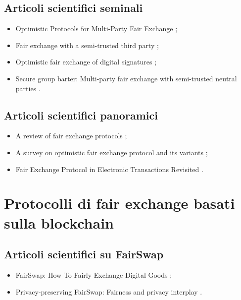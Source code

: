 \subsection*{Articoli scientifici seminali}
\begin{itemize}

\item Optimistic Protocols for Multi-Party Fair Exchange \cite{asokan1996fairexchange};

\item Fair exchange with a semi-trusted third party \cite{franklin1997fairexchange};

\item Optimistic fair exchange of digital signatures \cite{asokan1998fairexchange};

\item Secure group barter: Multi-party fair exchange with semi-trusted neutral parties \cite{franklin1998fairexchange}.

\end{itemize}

\subsection*{Articoli scientifici panoramici}
\begin{itemize}

\item A review of fair exchange protocols \cite{alotaibi2012fairreview};

\item A survey on optimistic fair exchange protocol and its variants \cite{loh2017fairreview};

\item Fair Exchange Protocol in Electronic Transactions Revisited \cite{duangphasuk2020fairreview}.

\end{itemize}

\section*{Protocolli di fair exchange basati sulla blockchain}

\subsection*{Articoli scientifici su FairSwap}
\begin{itemize}

\item FairSwap: How To Fairly Exchange Digital Goods \cite{dziembowski2018fairswap};

\item Privacy-preserving FairSwap: Fairness and privacy interplay \cite{avizheh2022fairswap}.

\end{itemize}

